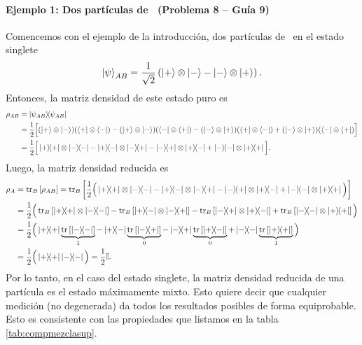 \documentclass[10pt, a4paper]{article}
\numberwithin{equation}{subsection}
\begin{document}
\paragraph{Ejemplo 1: Dos partículas de \spinhalf~(Problema 8 -- Guía 9)}
Comencemos con el ejemplo de la introducción, dos partículas de \spinhalf~en el
estado singlete
\begin{equation}
  \ket{\psi}_{AB} = \frac{1}{\sqrt{2}}\left(\ket{+}\otimes\ket{-} -
    \ket{-}\otimes\ket{+}\right).
\end{equation}
Entonces, la matriz densidad de este estado puro es
\begin{align}
  \rho_{AB}
  &= \projector{\psi_{AB}} \nonumber \\
  &= \frac{1}{2}\Big[ (\ket{+}\tensor\ket{-})(\bra{+}\tensor\bra{-}) -
    (\ket{+}\tensor\ket{-})(\bra{-}\tensor\bra{+}) -
    (\ket{-}\tensor\ket{+})(\bra{+}\tensor\bra{-}) +
    (\ket{-}\tensor\ket{+})(\bra{-}\tensor\bra{+}) \Big] \nonumber \\
  &= \frac{1}{2}\Big[ \ketbra{+}{+}\tensor\ketbra{-}{-} -
    \ketbra{+}{-}\tensor\ketbra{-}{+} - \ketbra{-}{+}\tensor\ketbra{+}{-} +
    \ketbra{-}{-}\tensor\ketbra{+}{+} \Big].
\end{align}
Luego, la matriz densidad reducida es
\begin{align}
  \rho_{A}
  &= \tr_B\left[\rho_{AB}\right]
  = \tr_B\left[ \frac{1}{2}\Big( \ketbra{+}{+}\otimes\ketbra{-}{-} -
    \ketbra{+}{-}\otimes\ketbra{-}{+} - \ketbra{-}{+}\otimes\ketbra{+}{-} +
    \ketbra{-}{-}\otimes\ketbra{+}{+} \Big) \right] \nonumber \\
  &= \frac{1}{2}\Big( \tr_B\left[\ketbra{+}{+}\otimes\ketbra{-}{-}\right] -
    \tr_B\left[\ketbra{+}{-}\otimes\ketbra{-}{+}\right] -
    \tr_B\left[\ketbra{-}{+}\otimes\ketbra{+}{-}\right] +
    \tr_B\left[\ketbra{-}{-}\otimes\ketbra{+}{+}\right] \Big) \nonumber \\
  &= \frac{1}{2}\Big(
    \ketbra{+}{+}\underbrace{\tr\left[\ketbra{-}{-}\right]}_{1} -
    \ketbra{+}{-}\underbrace{\tr\left[\ketbra{-}{+}\right]}_{0} -
    \ketbra{-}{+}\underbrace{\tr\left[\ketbra{+}{-}\right]}_{0} +
    \ketbra{-}{-}\underbrace{\tr\left[\ketbra{+}{+}\right]}_{1} \Big) \nonumber
    \\
  &= \frac{1}{2}\Big( \ketbra{+}{+} \ketbra{-}{-} \Big) = \frac{1}{2}\mathbb{I}.
\end{align}
Por lo tanto, en el caso del estado singlete, la matriz densidad reducida de
una partícula es el estado máximamente mixto. Esto quiere decir que cualquier
medición (no degenerada) da todos los resultados posibles de forma
equiprobable. Esto es consistente con las propiedades que listamos en la tabla
\ref{tab:compmezclasup}.
\end{document}
